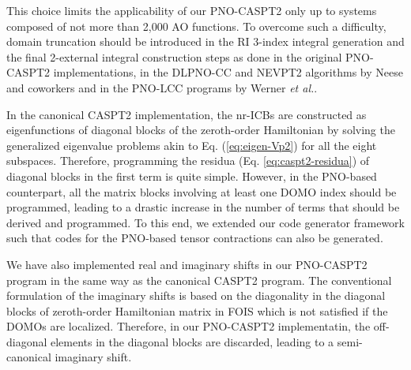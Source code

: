 \documentclass[aip,jcp,amsmath]{revtex4-1}
\begin{document}
%
This choice limits the applicability of our PNO-CASPT2 only up to systems composed of not more than 2,000 AO functions.
%
To overcome such a difficulty, domain truncation should be introduced in the RI 3-index integral generation and the final 2-external integral construction steps as done in the original PNO-CASPT2 implementations,\cite{:/content/aip/journal/jcp/145/12/10.1063/1.4963019,doi:10.1063/1.5097644} in the DLPNO-CC and NEVPT2 algorithms by Neese and coworkers\cite{riplingeran2013,riplingernatural2013,pinskisparse2015,riplingersparse2016,doi:10.1063/1.4981521,:/content/aip/journal/jcp/144/9/10.1063/1.4942769,dipayan2016,doi:10.1063/1.5027114} and in the PNO-LCC programs by Werner {\it et al.}.\cite{doi:10.1021/ct500725e,doi:10.1021/acs.jctc.5b00843,wernersdecay,doi:10.1021/acs.jctc.7b00554}

%
In the canonical CASPT2 implementation, the nr-ICBs are constructed as eigenfunctions of diagonal blocks of the zeroth-order Hamiltonian by solving the generalized eigenvalue problems akin to Eq. (\ref{eq:eigen-Vp2}) for all the eight subspaces.
%
Therefore, programming the residua (Eq. \ref{eq:caspt2-residua}) of diagonal blocks in the first term is quite simple.
%
However, in the PNO-based counterpart, all the matrix blocks involving at least one DOMO index should be programmed, leading to a drastic increase in the number of terms that should be derived and programmed.
%
To this end, we extended our code generator framework\cite{saitowmultireference2013,doi:10.1021/acs.jctc.5b00270} such that codes for the PNO-based tensor contractions can also be generated.

%
We have also implemented real\cite{ROOS1995215} and imaginary\cite{FORSBERG1997196} shifts in our PNO-CASPT2 program in the same way as the canonical CASPT2 program.
%
The conventional formulation of the imaginary shifts is based on the diagonality in the diagonal blocks of zeroth-order Hamiltonian matrix in FOIS which is not satisfied if the DOMOs are localized.
%
Therefore, in our PNO-CASPT2 implementatin, the off-diagonal elements in the diagonal blocks are discarded, leading to a semi-canonical imaginary shift.
\end{document}
